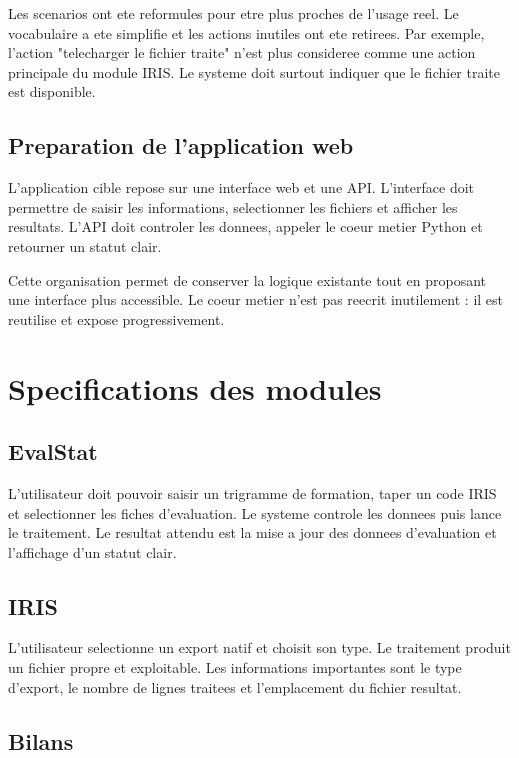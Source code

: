 \documentclass[11pt,a4paper]{report}
\begin{document}
Les scenarios ont ete reformules pour etre plus proches de l'usage reel. Le vocabulaire a ete simplifie et les actions inutiles ont ete retirees. Par exemple, l'action "telecharger le fichier traite" n'est plus consideree comme une action principale du module IRIS. Le systeme doit surtout indiquer que le fichier traite est disponible.

\section{Preparation de l'application web}

L'application cible repose sur une interface web et une API. L'interface doit permettre de saisir les informations, selectionner les fichiers et afficher les resultats. L'API doit controler les donnees, appeler le coeur metier Python et retourner un statut clair.

Cette organisation permet de conserver la logique existante tout en proposant une interface plus accessible. Le coeur metier n'est pas reecrit inutilement : il est reutilise et expose progressivement.

\chapter{Specifications des modules}

\section{EvalStat}

L'utilisateur doit pouvoir saisir un trigramme de formation, taper un code IRIS et selectionner les fiches d'evaluation. Le systeme controle les donnees puis lance le traitement. Le resultat attendu est la mise a jour des donnees d'evaluation et l'affichage d'un statut clair.

\section{IRIS}

L'utilisateur selectionne un export natif et choisit son type. Le traitement produit un fichier propre et exploitable. Les informations importantes sont le type d'export, le nombre de lignes traitees et l'emplacement du fichier resultat.

\section{Bilans}
\end{document}
